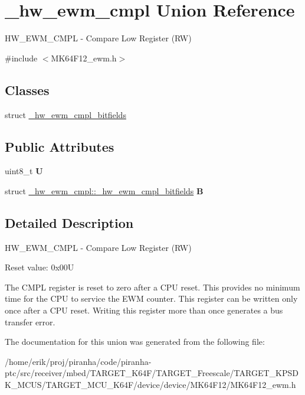 \hypertarget{union__hw__ewm__cmpl}{}\section{\+\_\+hw\+\_\+ewm\+\_\+cmpl Union Reference}
\label{union__hw__ewm__cmpl}


H\+W\+\_\+\+E\+W\+M\+\_\+\+C\+M\+PL -\/ Compare Low Register (RW)  




{\ttfamily \#include $<$M\+K64\+F12\+\_\+ewm.\+h$>$}

\subsection*{Classes}
\begin{DoxyCompactItemize}
\item 
struct \hyperlink{struct__hw__ewm__cmpl_1_1__hw__ewm__cmpl__bitfields}{\+\_\+hw\+\_\+ewm\+\_\+cmpl\+\_\+bitfields}
\end{DoxyCompactItemize}
\subsection*{Public Attributes}
\begin{DoxyCompactItemize}
\item 
uint8\+\_\+t {\bfseries U}\hypertarget{union__hw__ewm__cmpl_a3ab1d3893f16b8f2004c11c0c47a1dc5}{}\label{union__hw__ewm__cmpl_a3ab1d3893f16b8f2004c11c0c47a1dc5}

\item 
struct \hyperlink{struct__hw__ewm__cmpl_1_1__hw__ewm__cmpl__bitfields}{\+\_\+hw\+\_\+ewm\+\_\+cmpl\+::\+\_\+hw\+\_\+ewm\+\_\+cmpl\+\_\+bitfields} {\bfseries B}\hypertarget{union__hw__ewm__cmpl_a74ed59fc932c22c40eae58ef22f674aa}{}\label{union__hw__ewm__cmpl_a74ed59fc932c22c40eae58ef22f674aa}

\end{DoxyCompactItemize}


\subsection{Detailed Description}
H\+W\+\_\+\+E\+W\+M\+\_\+\+C\+M\+PL -\/ Compare Low Register (RW) 

Reset value\+: 0x00U

The C\+M\+PL register is reset to zero after a C\+PU reset. This provides no minimum time for the C\+PU to service the E\+WM counter. This register can be written only once after a C\+PU reset. Writing this register more than once generates a bus transfer error. 

The documentation for this union was generated from the following file\+:\begin{DoxyCompactItemize}
\item 
/home/erik/proj/piranha/code/piranha-\/ptc/src/receiver/mbed/\+T\+A\+R\+G\+E\+T\+\_\+\+K64\+F/\+T\+A\+R\+G\+E\+T\+\_\+\+Freescale/\+T\+A\+R\+G\+E\+T\+\_\+\+K\+P\+S\+D\+K\+\_\+\+M\+C\+U\+S/\+T\+A\+R\+G\+E\+T\+\_\+\+M\+C\+U\+\_\+\+K64\+F/device/device/\+M\+K64\+F12/M\+K64\+F12\+\_\+ewm.\+h\end{DoxyCompactItemize}
